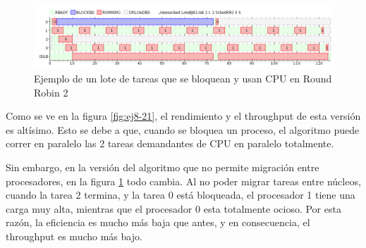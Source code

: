 \begin{figure}[H]
\caption{Ejemplo de un lote de tareas que se bloquean y usan CPU en Round Robin 2}
\label{fig:ej8-22}
\includegraphics[width=1\textwidth]{imgs/ej8-2rr2.png}
\end{figure}


Como se ve en la figura \ref{fig:ej8-21}, el rendimiento y el throughput de esta versión es altísimo. Esto se debe a que, cuando se bloquea un proceso, el algoritmo puede correr en paralelo las 2 tareas demandantes de CPU en paralelo totalmente.

Sin embargo, en la versión del algoritmo que no permite migración entre procesadores, en la figura \ref{fig:ej8-22} todo cambia. Al no poder migrar tareas entre núcleos, cuando la tarea 2 termina, y la tarea 0 está bloqueada, el procesador 1 tiene una carga muy alta, mientras que el procesador 0 esta totalmente ocioso. Por esta razón, la eficiencia es mucho más baja que antes, y en consecuencia, el throughput es mucho más bajo.



